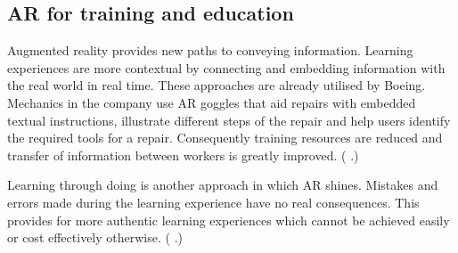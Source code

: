 \documentclass[12pt, a4paper,oneside, nocenter]{thesis}
\renewcommand{\citep}[1]{(\citeauthor{#1} \citeyear{#1}.)}
\begin{document}
\subsection{AR for training and education}%
Augmented reality provides new paths to conveying information. Learning experiences are more contextual by connecting and embedding information with the real world in real time. These approaches are already utilised by Boeing. 
Mechanics in the company use AR goggles that aid repairs with embedded textual instructions, 
illustrate different steps of the repair and help users identify the required tools for a repair. 
Consequently training resources are reduced and transfer of information between workers is greatly 
improved. \citep{horizon-report}
\par
Learning through doing is another approach in which AR shines. Mistakes and errors made during the learning
experience have no real consequences. This provides for more authentic learning experiences which cannot be
achieved easily or cost effectively otherwise. \citep{augmented-reality}
\end{document}
